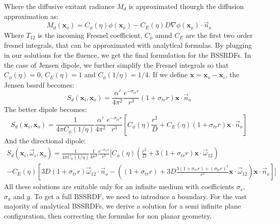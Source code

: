 Where the diffusive exitant radiance $M_d$ is approximated thourgh the diffusion approximation as:
\begin{equation*}
M_d(\mathbf{x}_o) =  C_\phi(\eta) \phi(\mathbf{x}_o) - C_E(\eta) D \nabla\phi(\mathbf{x}_o) \cdot \vec{n}_o
\end{equation*}
Where $T_{12}$ is the incoming Fresnel coefficient, $C_\phi$ amnd $C_E$ are the first two order fresnel integrals, that can be approximated with analytical formulas. By plugging in our solutions for the fluence, we get the final formulation for the BSSRDFs. In the case of Jensen dipole, we further simplify the Fresnel integrals so that $C_\phi(\eta) = 0$, $C_E(\eta) = 1$ and $C_\phi(1/\eta) = 1/4$. If we define $\mathbf{x} = \mathbf{x}_o - \mathbf{x}_i$, the Jensen bssrdf becomes:
\begin{equation*}
S_d(\mathbf{x}_i, \mathbf{x}_o)  =  \frac{\alpha'}{4 \pi^2} \frac{e^{-\sigma_{tr} r}}{r^3} (1 + \sigma_{tr} r) \mathbf{x} \cdot \vec{n}_o 
\end{equation*}
The better dipole becomes:
\begin{equation*}
S_d(\mathbf{x}_i, \mathbf{x}_o)  = \frac{1}{4\pi C_\phi(1/\eta)} \frac{\alpha'}{4 \pi^2} \frac{e^{-\sigma_{tr} r}}{r^3} \left[ C_\phi(\eta) \frac{r^2}{D} + C_E(\eta) (1 + \sigma_{tr} r) \mathbf{x} \cdot \vec{n}_o \right]
\end{equation*}
And the directional dipole:
\begin{multline*}
S_d(\mathbf{x}_i, \vec{\omega}_i, \mathbf{x}_o)  = \frac{1}{4\pi C_\phi(1/\eta)} \frac{1}{4 \pi^2} \frac{e^{-\sigma_{tr} r}}{r^3} \bigg[ C_\phi(\eta) (\frac{r^2}{D} +  3 (1 + \sigma_{tr} r) \mathbf{x}\cdot\vec{\omega}_{12} ) \\ - C_E(\eta) \left[3D (1 + \sigma_{tr} r) \vec{\omega}_{12} \cdot \vec{n}_o - \left((1 + \sigma_{tr} r) + 3D \frac{3 (1 + \sigma_{tr} r)  + (\sigma_{tr} r)^2}{r^2}\mathbf{x}\cdot\vec{\omega}_{12}\right) \mathbf{x} \cdot \vec{n}_o\right] \bigg]
\end{multline*}
All these solutions are suitable only for an infinite medium with coefficients $\sigma_s$, $\sigma_a$ and $g$. To get a full BSSRDF, we need to introduce a boundary. For the vast majority of analytical BSSRDFs, we derive a solution for a semi infinite plane configuration, then correcting the formulas for non planar geometry. 

